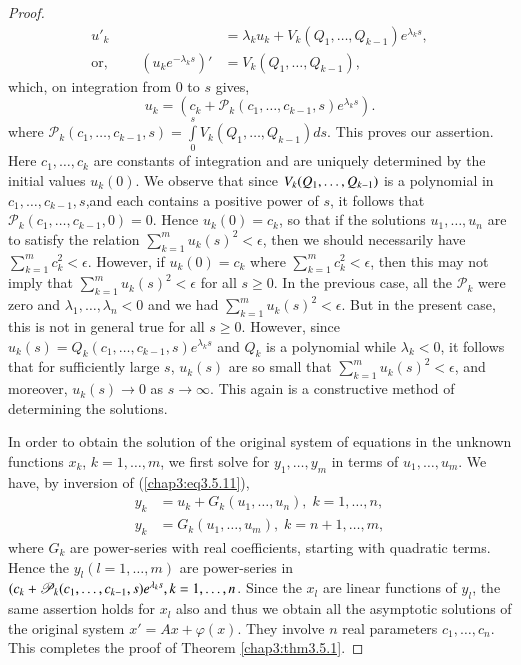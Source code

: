 \begin{proof}
\begin{align*}
u'_k & = \lambda_k u_k + V_k (Q_1, \ldots, Q_{k-1}) e^{\lambda_ks},\\
\text{or, } \qquad (u_k e^{-\lambda_ks})' & = V_k (Q_1, \ldots, Q_{k-1}), 
\end{align*}
which, on integration from 0 to $s$ gives,
$$
u_k = (c_k + \mathscr{P}_k(c_1, \ldots, c_{k-1}, s)e^{\lambda_ks}). 
$$
where $\mathscr{P}_k(c_1, \ldots, c_{k-1},s) = \int\limits^s_0
V_k(Q_1, \ldots, Q_{k-1}) ds$. 
This proves our assertion. Here $c_1, \ldots, c_k$ are constants of
integration and are uniquely determined by the initial values
$u_k(0)$. We observe that since $V_k(Q_1,\break \ldots, Q_{k-1})$ is a
polynomial in $c_1, \ldots, c_{k-1},s$,\pageoriginale and each
contains a positive power of $s$, it follows that $\mathscr{P}_k(c_1,
\ldots, c_{k-1}, 0) = 0$. Hence $u_k(0) = c_k$, so that if the
solutions $u_1, \ldots, u_n$ are to satisfy the relation
$\sum\limits^m_{k=1} u_k (s)^2 < \epsilon$, then we should necessarily
have $\sum\limits^m_{k=1} c^2_k < \epsilon$. However, if $u_k(0) =
c_k$ where $\sum\limits^m_{k=1} c^2_k < \epsilon$, then this may not
imply that $\sum\limits^m_{k=1} u_k(s)^2 < \epsilon$ for all $s \geq
0$. In the previous case, all the $\mathscr{P}_k$ were zero and
$\lambda_1, \ldots, \lambda_n < 0$ and we had $\sum\limits^m_{k=1}
u_k(s)^2 < \epsilon$. But in the present case, this is not in general
true for all $s \geq 0$. However, since $u_k(s) = Q_k (c_1, \ldots,
c_{k-1}, s) e^{\lambda_k s}$ and $Q_k$ is a polynomial while
$\lambda_k < 0$, it follows that for sufficiently large $s$, $u_k(s)$
are so small that $\sum\limits^m_{k=1} u_k(s)^2 < \epsilon$, and
moreover, $u_k(s) \to 0$ as $s \to \infty$. This again is a
constructive method of determining the solutions. 

In order to obtain the solution of the original system of equations in
the unknown functions $x_k$, $k = 1, \ldots, m$, we first solve for
$y_1, \ldots, y_m$ in terms of $u_1, \ldots, u_m$. We have, by
inversion of (\ref{chap3:eq3.5.11}), 
\begin{align*}
y_k & = u_k + G_k (u_1, \ldots, u_n), \; k = 1, \ldots, n,\\
y_k & = G_k (u_1, \ldots, u_m), \; k = n+1, \ldots, m,
\end{align*}
where $G_k$ are power-series with real coefficients, starting with
quadratic terms. Hence the $y_l(l=1, \ldots, m)$ are power-series in
$(c_k + \mathscr{P}_k(c_1, \ldots,\break c_{k-1}, s) e^{\lambda_k s}, k = 1,
\ldots, n$. Since the $x_l$ are linear functions of $y_l$, the same
assertion holds for $x_l$ also and thus we obtain all\pageoriginale
the asymptotic solutions of the original system $x' = Ax+
\varphi(x)$. They involve $n$ real parameters $c_1, \ldots, c_n$. This
completes the proof of Theorem \ref{chap3:thm3.5.1}. 
\end{proof}


